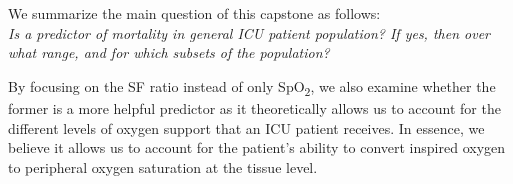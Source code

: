 We summarize the main question of this capstone as follows: \\
\textit{Is \SF a predictor of mortality in general ICU patient population? If yes, then over what range, and for which subsets of the population? 
}

By focusing on the SF ratio instead of only SpO\textsubscript{2}, we also examine whether the former is a more helpful predictor as it theoretically allows us to account for the different levels of oxygen support that an ICU patient receives. In essence, we believe it allows us to account for the patient's ability to convert inspired oxygen to peripheral oxygen saturation at the tissue level. 






